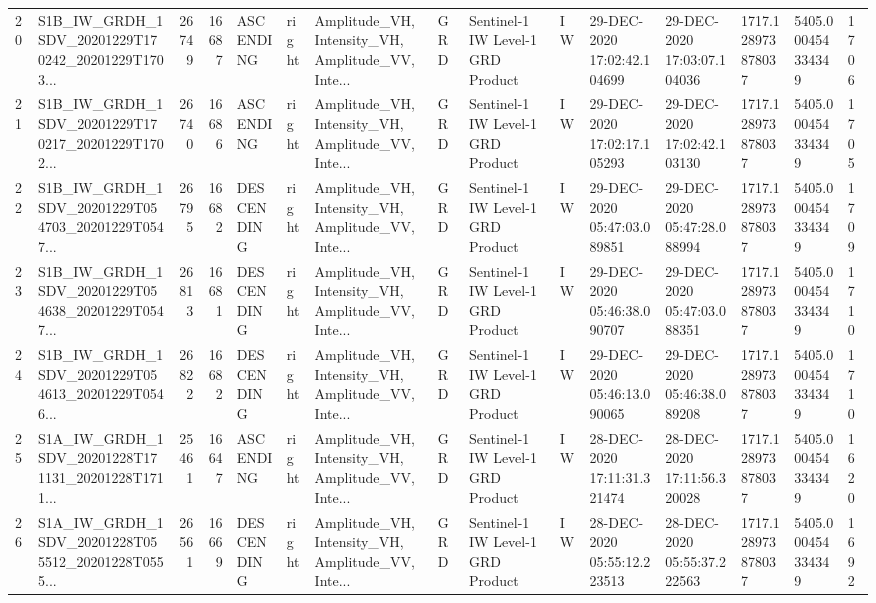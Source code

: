 \begin{tabular}{llrrlllllllllll}
20  &  S1B\_IW\_GRDH\_1SDV\_20201229T170242\_20201229T1703... &  26749 &   16687 &   ASCENDING &  right &  Amplitude\_VH, Intensity\_VH, Amplitude\_VV, Inte... &          GRD &  Sentinel-1 IW Level-1 GRD Product &              IW &  29-DEC-2020 17:02:42.104699 &  29-DEC-2020 17:03:07.104036 &          1717.128973878037 &  5405.000454334349 &       1706 \\
21  &  S1B\_IW\_GRDH\_1SDV\_20201229T170217\_20201229T1702... &  26740 &   16686 &   ASCENDING &  right &  Amplitude\_VH, Intensity\_VH, Amplitude\_VV, Inte... &          GRD &  Sentinel-1 IW Level-1 GRD Product &              IW &  29-DEC-2020 17:02:17.105293 &  29-DEC-2020 17:02:42.103130 &          1717.128973878037 &  5405.000454334349 &       1705 \\
22  &  S1B\_IW\_GRDH\_1SDV\_20201229T054703\_20201229T0547... &  26795 &   16682 &  DESCENDING &  right &  Amplitude\_VH, Intensity\_VH, Amplitude\_VV, Inte... &          GRD &  Sentinel-1 IW Level-1 GRD Product &              IW &  29-DEC-2020 05:47:03.089851 &  29-DEC-2020 05:47:28.088994 &          1717.128973878037 &  5405.000454334349 &       1709 \\
23  &  S1B\_IW\_GRDH\_1SDV\_20201229T054638\_20201229T0547... &  26813 &   16681 &  DESCENDING &  right &  Amplitude\_VH, Intensity\_VH, Amplitude\_VV, Inte... &          GRD &  Sentinel-1 IW Level-1 GRD Product &              IW &  29-DEC-2020 05:46:38.090707 &  29-DEC-2020 05:47:03.088351 &          1717.128973878037 &  5405.000454334349 &       1710 \\
24  &  S1B\_IW\_GRDH\_1SDV\_20201229T054613\_20201229T0546... &  26822 &   16682 &  DESCENDING &  right &  Amplitude\_VH, Intensity\_VH, Amplitude\_VV, Inte... &          GRD &  Sentinel-1 IW Level-1 GRD Product &              IW &  29-DEC-2020 05:46:13.090065 &  29-DEC-2020 05:46:38.089208 &          1717.128973878037 &  5405.000454334349 &       1710 \\
25  &  S1A\_IW\_GRDH\_1SDV\_20201228T171131\_20201228T1711... &  25461 &   16647 &   ASCENDING &  right &  Amplitude\_VH, Intensity\_VH, Amplitude\_VV, Inte... &          GRD &  Sentinel-1 IW Level-1 GRD Product &              IW &  28-DEC-2020 17:11:31.321474 &  28-DEC-2020 17:11:56.320028 &          1717.128973878037 &  5405.000454334349 &       1620 \\
26  &  S1A\_IW\_GRDH\_1SDV\_20201228T055512\_20201228T0555... &  26561 &   16669 &  DESCENDING &  right &  Amplitude\_VH, Intensity\_VH, Amplitude\_VV, Inte... &          GRD &  Sentinel-1 IW Level-1 GRD Product &              IW &  28-DEC-2020 05:55:12.223513 &  28-DEC-2020 05:55:37.222563 &          1717.128973878037 &  5405.000454334349 &       1692 \\

\end{tabular}
